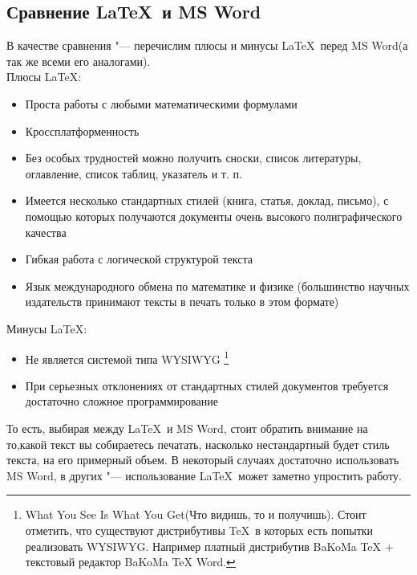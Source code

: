 \documentclass{article}
\begin{document}
		\subsection{Сравнение \LaTeX ~и MS Word}
			В качестве сравнения "--- перечислим плюсы и минусы \LaTeX ~перед MS Word(а так же всеми его аналогами). \\	
	    Плюсы \LaTeX: 
	    \begin{itemize} 
	    	\item	Проста работы с любыми математическими формулами
	    	\item	Кроссплатформенность 
	    	\item	Без особых трудностей можно получить сноски, список литературы,
					оглавление, список таблиц, указатель и т. п.
	    	\item	Имеется несколько стандартных стилей (книга, статья, доклад,
					письмо), с помощью которых получаются документы очень высокого
					полиграфического качества 
	    	\item	Гибкая работа с логической структурой текста
	    	\item	Язык международного обмена по математике и физике (большинство     
   					научных издательств принимают тексты в печать  только в этом формате)
    	\end{itemize}
    	\newpage
    	Минусы \LaTeX:
		\begin{itemize} 
	    	\item	Не является системой типа WYSIWYG
	    				\footnote{What You See Is What You Get(Что видишь, то и получишь). Стоит отметить, что существуют 									дистрибутивы \TeX ~в которых есть попытки реализовать WYSIWYG. Например платный дистрибутив  BaKoMa TeX + 						текстовый редактор  BaKoMa TeX Word.}   
	    	\item	При серьезных отклонениях от стандартных стилей документов требуется
					достаточно сложное программирование	
    	\end{itemize}
    	
    		То есть, выбирая между \LaTeX ~и MS Word, стоит обратить внимание на то,какой текст вы собираетесь печатать, 					насколько нестандартный будет стиль текста, на его примерный объем. В некоторый случаях достаточно использовать MS Word,   		в других "--- использование \LaTeX ~может заметно упростить работу.
		\newpage		
\end{document}
